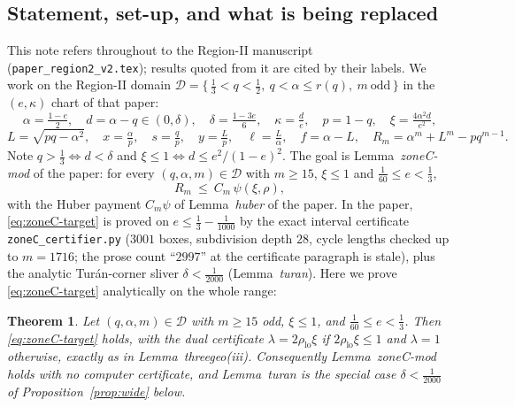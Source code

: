 \documentclass[11pt]{article}
\newtheorem{theorem}{Theorem}[section]
\theoremstyle{remark}
\theoremstyle{plain}
\theoremstyle{plain}
\newcommand{\D}{\mathcal D}
\begin{document}
\subsection{Statement, set-up, and what is being replaced}\label{sec:zoneC-setup}

This note refers throughout to the Region-II manuscript
(\texttt{paper\_region2\_v2.tex}); results quoted from it are cited by their
labels.  We work on the Region-II domain
$\D=\{\,\tfrac13<q<\tfrac12,\ q<\alpha\le r(q),\ m\ \text{odd}\,\}$ in the
$(e,\kappa)$ chart of that paper:
\[
 \alpha=\tfrac{1-e}2,\quad d=\alpha-q\in(0,\delta),\quad
 \delta=\tfrac{1-3e}6,\quad \kappa=\tfrac de,\quad p=1-q,\quad
 \xi=\tfrac{4\alpha^2d}{e^2},
\]
\[
 L=\sqrt{pq-\alpha^2},\quad x=\tfrac\alpha p,\quad s=\tfrac qp,\quad
 y=\tfrac Lp,\quad \ell=\tfrac L\alpha,\quad f=\alpha-L,\quad
 R_m=\alpha^m+L^m-pq^{m-1}.
\]
Note $q>\tfrac13\iff d<\delta$ and $\xi\le1\iff d\le e^2/(1-e)^2$.  The goal
is Lemma~\emph{zoneC-mod} of the paper: for every
$(q,\alpha,m)\in\D$ with $m\ge15$, $\xi\le1$ and $\tfrac1{60}\le e<\tfrac13$,
\begin{equation}\label{eq:zoneC-target}
 R_m\ \le\ C_m\,\psi(\xi,\rho),
\end{equation}
with the Huber payment $C_m\psi$ of Lemma~\emph{huber} of the paper.  In the
paper, \eqref{eq:zoneC-target} is proved on $e\le\tfrac13-\tfrac1{1000}$ by the
exact interval certificate \texttt{zoneC\_certifier.py} ($3001$ boxes,
subdivision depth $28$, cycle lengths checked up to $m=1716$; the prose count
``$2997$'' at the certificate paragraph is stale), plus the analytic
Tur\'an-corner sliver $\delta<\tfrac1{2000}$ (Lemma~\emph{turan}).  Here we
prove \eqref{eq:zoneC-target} analytically on the whole range:

\begin{theorem}\label{thm:zoneC-main}
Let $(q,\alpha,m)\in\D$ with $m\ge15$ odd, $\xi\le1$, and
$\tfrac1{60}\le e<\tfrac13$.  Then \eqref{eq:zoneC-target} holds, with the dual
certificate $\lambda=2\rho_{\mathrm{lo}}\xi$ if
$2\rho_{\mathrm{lo}}\xi\le1$ and $\lambda=1$ otherwise, exactly as in
Lemma~\emph{threegeo}(iii).  Consequently Lemma~\emph{zoneC-mod} holds with
no computer certificate, and Lemma~\emph{turan} is the special case
$\delta<\tfrac1{2000}$ of Proposition~\ref{prop:wide} below.
\end{theorem}
\end{document}

